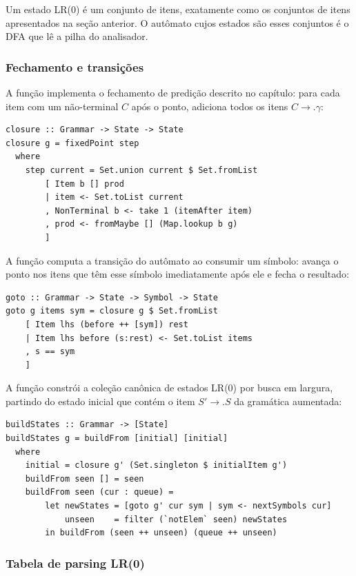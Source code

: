 Um estado LR(0) é um conjunto de itens, exatamente como os conjuntos
de itens apresentados na seção anterior. O autômato cujos estados são
esses conjuntos é o DFA que lê a pilha do analisador.

\subsubsection{Fechamento e transições}

A função  implementa o fechamento de
predição descrito no capítulo: para cada item com um não-terminal
\(C\) após o ponto, adiciona todos os itens \(C \to . \gamma\):

\begin{verbatim}
closure :: Grammar -> State -> State
closure g = fixedPoint step
  where
    step current = Set.union current $ Set.fromList
        [ Item b [] prod
        | item <- Set.toList current
        , NonTerminal b <- take 1 (itemAfter item)
        , prod <- fromMaybe [] (Map.lookup b g)
        ]
\end{verbatim}

A função  computa a transição do
autômato ao consumir um símbolo: avança o ponto nos itens que têm
esse símbolo imediatamente após ele e fecha o resultado:

\begin{verbatim}
goto :: Grammar -> State -> Symbol -> State
goto g items sym = closure g $ Set.fromList
    [ Item lhs (before ++ [sym]) rest
    | Item lhs before (s:rest) <- Set.toList items
    , s == sym
    ]
\end{verbatim}

A função  constrói a coleção
canônica de estados LR(0) por busca em largura, partindo do estado
inicial que contém o item \(S' \to . S\) da gramática aumentada:

\begin{verbatim}
buildStates :: Grammar -> [State]
buildStates g = buildFrom [initial] [initial]
  where
    initial = closure g' (Set.singleton $ initialItem g')
    buildFrom seen [] = seen
    buildFrom seen (cur : queue) =
        let newStates = [goto g' cur sym | sym <- nextSymbols cur]
            unseen    = filter (`notElem` seen) newStates
        in buildFrom (seen ++ unseen) (queue ++ unseen)
\end{verbatim}

\subsubsection{Tabela de parsing LR(0)}


